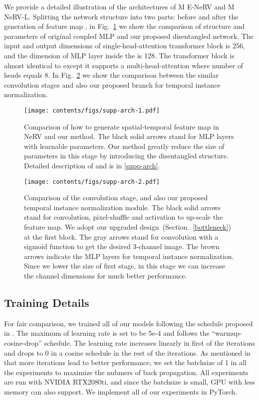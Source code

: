 \documentclass[runningheads]{llncs}
\begin{document}
We provide a detailed illustration of the architectures of M E-NeRV and M NeRV-L. Splitting the network structure into two parts: before and after the generation of feature map , in Fig.~\ref{fig:comparison_first} we show the comparison of structure and parameters of original coupled MLP and our proposed disentangled network. The input and output dimensions of single-head-attention transformer block  is 256, and the dimension of MLP layer inside the  is 128. The transformer block  is almost identical to  except it supports a multi-head-attention where number of heads equals 8. In Fig.~\ref{fig:comparison_second} we show the comparison between the similar convolution stages and also our proposed branch for temporal instance normalization.

\begin{figure}[h]
    \centering
    \texttt{[image: contents/figs/supp-arch-1.pdf]}
    \caption{Comparison of how to generate spatial-temporal feature map in NeRV and our method. The black solid arrows stand for MLP layers with learnable parameters. Our method greatly reduce the size of parameters in this stage by introducing the disentangled structure. Detailed description of  and  is in \ref{supp-arch}.}
    \label{fig:comparison_first}
\end{figure}

\begin{figure}[h]
    \centering
    \texttt{[image: contents/figs/supp-arch-2.pdf]}
    \caption{Comparison of the convolution stage, and also our proposed temporal instance normalization module. The black solid arrows stand for  convolution, pixel-shuffle and activation to up-scale the feature map. We adopt our upgraded design~(Section.~\ref{bottleneck}) at the first block. The gray arrows stand for  convolution with a sigmoid function to get the desired 3-channel image. The brown arrows indicate the MLP layers for temporal instance normalization. Since we lower the size of first stage, in this stage we can increase the channel dimensions for much better performance.}
    \label{fig:comparison_second}
\end{figure}

\subsection{Training Details}

For fair comparison, we trained all of our models following the schedule proposed in \cite{chen2021nerv}. The maximum of learning rate is set to be 5e-4 and follows the ``warmup-cosine-drop'' schedule. The learning rate increases linearly in first  of the iterations and drops to 0 in a cosine schedule in the rest of the iterations. As mentioned in \cite{chen2021nerv} that more iterations lead to better performance, we set the batchsize of 1 in all the experiments to maximize the nubmers of back propagation.  All experiments are run with NVIDIA RTX2080ti, and since the batchsize is small, GPU with less memory can also support. We implement all of our experiments in PyTorch.
\end{document}

